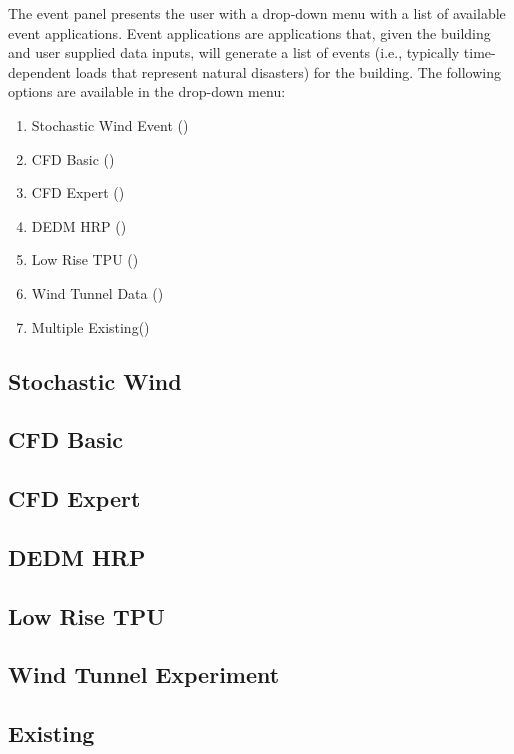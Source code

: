 The event panel presents the user with a drop-down menu with a list of
available event applications. Event applications are applications
that, given the building and user supplied data inputs, will generate
a list of events (i.e., typically time-dependent loads that represent natural disasters) for the building. The following options
are available in the drop-down menu:

\begin{enumerate}
\item Stochastic Wind Event ()
\item CFD Basic ()
\item CFD Expert ()
\item DEDM HRP ()
\item Low Rise TPU ()
\item Wind Tunnel Data ()
\item Multiple Existing()
\end{enumerate}

\subsection{Stochastic Wind}
\label{subsec:stochastic_wind}


\subsection{CFD Basic}
\label{subsec:cfd_basic}


\subsection{CFD Expert}
\label{subsec:cfd_expert}


\subsection{DEDM HRP}
\label{subsec:dedm_hrp}


\subsection{Low Rise TPU}
\label{subsec:lowRiseTPU}


\subsection{Wind Tunnel Experiment}
\label{subsec:windTunnelExperiment}


\subsection{Existing}
\label{subsec:multiple_existing}

